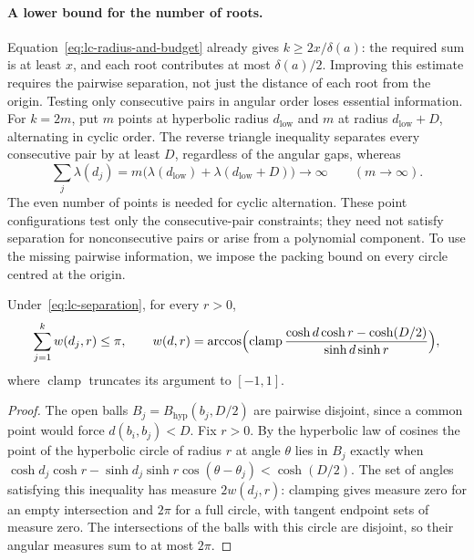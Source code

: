 \paragraph{A lower bound for the number of roots.}
Equation~\eqref{eq:lc-radius-and-budget} already gives
$k\ge2x/\delta(a)$: the required sum is at least $x$, and each root
contributes at most $\delta(a)/2$. Improving this estimate requires the
pairwise separation, not just the distance of each root from the origin.
Testing only consecutive pairs in angular order loses essential information.
For $k=2m$, put $m$ points at hyperbolic radius $d_{\mathrm{low}}$ and
$m$ at radius $d_{\mathrm{low}}+D$, alternating in cyclic order. The
reverse triangle inequality separates every consecutive pair by at least
$D$, regardless of the angular gaps, whereas
\[
 \sum_j\lambda(d_j)
 =m\bigl(\lambda(d_{\mathrm{low}})+\lambda(d_{\mathrm{low}}+D)\bigr)
 \longrightarrow\infty\qquad(m\to\infty).
\]
The even number of points is needed for cyclic alternation. These point
configurations test only the consecutive-pair constraints; they need not
satisfy separation for nonconsecutive pairs or arise from a polynomial
component. To use the missing pairwise information, we impose the packing
bound on every circle centred at the origin.

\begin{lemma}\label{res:circle-slice-packing}
Under~\eqref{eq:lc-separation}, for every $r>0$,
\[
 \sum_{j=1}^{k}w(d_j,r)\le\pi,\qquad
 w(d,r)=\arccos\Bigl(\operatorname{clamp}
   \frac{\cosh d\cosh r-\cosh(D/2)}{\sinh d\sinh r}\Bigr),
\]
where $\operatorname{clamp}$ truncates its argument to $[-1,1]$.
\end{lemma}

\begin{proof}
The open balls $B_j=B_{\mathrm{hyp}}(b_j,D/2)$ are pairwise disjoint, since a
common point would force $d(b_i,b_j)<D$.  Fix $r>0$.  By the hyperbolic law of
cosines the point of the hyperbolic circle of radius $r$ at angle $\theta$
lies in $B_j$ exactly when
$\cosh d_j\cosh r-\sinh d_j\sinh r\cos(\theta-\theta_j)<\cosh(D/2)$.
The set of angles satisfying this inequality has measure $2w(d_j,r)$:
clamping gives measure zero for an empty intersection and $2\pi$ for a
full circle, with tangent endpoint sets of measure zero. The intersections
of the balls with this circle are disjoint, so their angular measures
sum to at most $2\pi$.
\end{proof}

